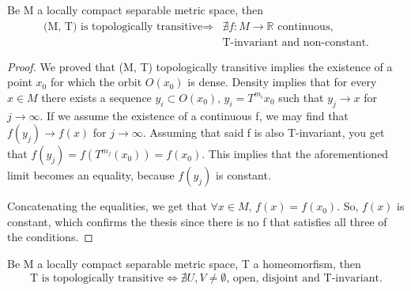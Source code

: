 \begin{proposition}
    Be M a locally compact separable metric space, then \begin{align*}
        \text{(M, T) is topologically transitive} \Rightarrow & \nexists f:M\rightarrow \mathbb{R}\text{ continuous,} \\&\text{T-invariant and non-constant.}
    \end{align*}
\end{proposition}
\begin{proof}
    We proved that (M, T) topologically transitive implies the existence of a point $x_0$ for which the orbit $O(x_0)$ is dense. Density implies that for every $x\in M$ there exists a sequence $y_i\subset O(x_0),\, y_i=T^{m_i}x_0$ such that $y_j\rightarrow x$ for $j\rightarrow\infty$. If we assume the existence of a continuous f, we may find that $f(y_j)\rightarrow f(x)$ for $j\rightarrow\infty$. Assuming that said f is also T-invariant, you get that $f(y_j)=f(T^{m_j}(x_0))=f(x_0)$. This implies that the aforementioned limit becomes an equality, because $f(y_j)$ is constant. 
    
    Concatenating the equalities, we get that  $\forall x\in M,\, f(x)=f(x_0)$. So, $f(x)$ is constant, which confirms the thesis since there is no f that satisfies all three of the conditions.
\end{proof}

\begin{lemma}
    Be M  a locally compact separable metric space, T a homeomorfism, then \begin{equation*}
        \text{T is topologically transitive} \iff \nexists U, V\neq\emptyset\text{, open, disjoint and T-invariant.}
    \end{equation*} 
\end{lemma}

